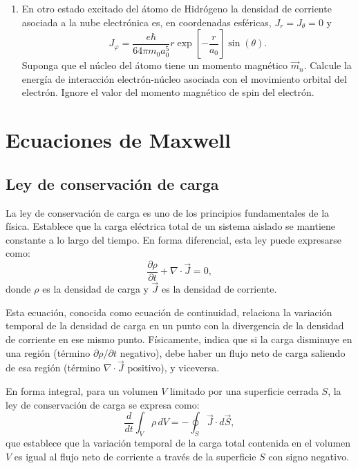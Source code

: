 \documentclass[12pt,a4paper]{book}
\begin{document}
\begin{enumerate}
\item En otro estado excitado del átomo de Hidrógeno la densidad de corriente asociada a la nube electrónica es, en coordenadas esféricas, $J_r = J_\theta = 0$ y
\begin{equation*}
J_\varphi = \frac{e\hbar}{64\pi m_0 a_0^5}r\exp\left[-\frac{r}{a_0}\right]\sin(\theta).
\end{equation*}
Suponga que el núcleo del átomo tiene un momento magnético $\vec{m}_n$. Calcule la energía de interacción electrón-núcleo asociada con el movimiento orbital del electrón. Ignore el valor del momento magnético de spin del electrón.
\end{enumerate}

\chapter{Ecuaciones de Maxwell}
\section{Ley de conservación de carga}

La ley de conservación de carga es uno de los principios fundamentales de la física. Establece que la carga eléctrica total de un sistema aislado se mantiene constante a lo largo del tiempo. En forma diferencial, esta ley puede expresarse como:
\begin{equation}
\frac{\partial \rho}{\partial t} + \nabla \cdot \vec{J} = 0,
\end{equation}
donde $\rho$ es la densidad de carga y $\vec{J}$ es la densidad de corriente.

Esta ecuación, conocida como ecuación de continuidad, relaciona la variación temporal de la densidad de carga en un punto con la divergencia de la densidad de corriente en ese mismo punto. Físicamente, indica que si la carga disminuye en una región (término $\partial \rho / \partial t$ negativo), debe haber un flujo neto de carga saliendo de esa región (término $\nabla \cdot \vec{J}$ positivo), y viceversa.

En forma integral, para un volumen $V$ limitado por una superficie cerrada $S$, la ley de conservación de carga se expresa como:
\begin{equation}
\frac{d}{dt} \int_V \rho \, dV = -\oint_S \vec{J} \cdot d\vec{S},
\end{equation}
que establece que la variación temporal de la carga total contenida en el volumen $V$ es igual al flujo neto de corriente a través de la superficie $S$ con signo negativo.
\end{document}
